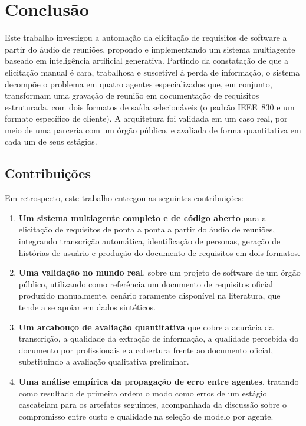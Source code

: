 
\chapter{Conclusão}
\label{cap:conclusao}

Este trabalho investigou a automação da elicitação de requisitos de software a partir do áudio de reuniões, propondo e implementando um sistema multiagente baseado em inteligência artificial generativa. Partindo da constatação de que a elicitação manual é cara, trabalhosa e suscetível à perda de informação, o sistema decompõe o problema em quatro agentes especializados que, em conjunto, transformam uma gravação de reunião em documentação de requisitos estruturada, com dois formatos de saída selecionáveis (o padrão IEEE~830 e um formato específico de cliente). A arquitetura foi validada em um caso real, por meio de uma parceria com um órgão público, e avaliada de forma quantitativa em cada um de seus estágios.

\section{Contribuições}

Em retrospecto, este trabalho entregou as seguintes contribuições:

\begin{enumerate}
    \item[1.] \textbf{Um sistema multiagente completo e de código aberto} para a elicitação de requisitos de ponta a ponta a partir do áudio de reuniões, integrando transcrição automática, identificação de personas, geração de histórias de usuário e produção do documento de requisitos em dois formatos.
    \item[2.] \textbf{Uma validação no mundo real}, sobre um projeto de software de um órgão público, utilizando como referência um documento de requisitos oficial produzido manualmente, cenário raramente disponível na literatura, que tende a se apoiar em dados sintéticos.
    \item[3.] \textbf{Um arcabouço de avaliação quantitativa} que cobre a acurácia da transcrição, a qualidade da extração de informação, a qualidade percebida do documento por profissionais e a cobertura frente ao documento oficial, substituindo a avaliação qualitativa preliminar.
    \item[4.] \textbf{Uma análise empírica da propagação de erro entre agentes}, tratando como resultado de primeira ordem o modo como erros de um estágio cascateiam para os artefatos seguintes, acompanhada da discussão sobre o compromisso entre custo e qualidade na seleção de modelo por agente.
\end{enumerate}

